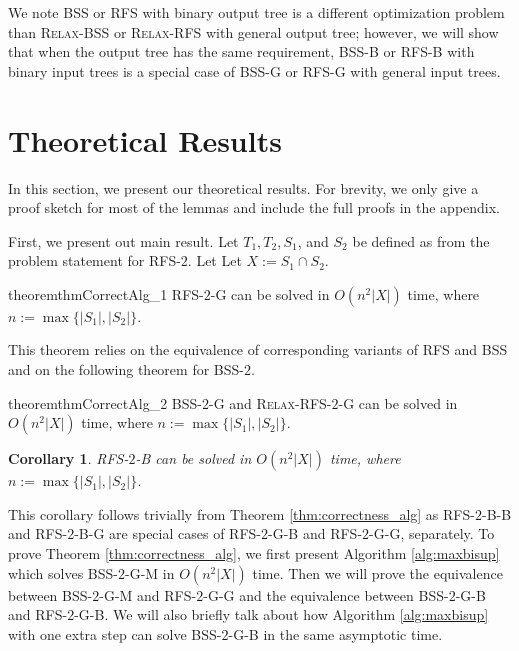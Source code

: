 \documentclass[twocolumn]{bmcart}%
\newcommand{\bss}{\textsc{BSS}\xspace}
\newcommand{\rfs}{\textsc{RFS}\xspace}
\newcommand{\relaxed}{\textsc{Relax}-}
\newcommand{\bsstwo}{\textsc{BSS-$2$}\xspace}
\newcommand{\rftwo}{\textsc{RFS-$2$}\xspace}
\newcommand{\B}{\textsc{B}\xspace}
\renewcommand{\G}{\textsc{G}\xspace}
\renewcommand{\M}{\textsc{M}\xspace}
\theoremstyle{mystyle}
\newtheorem{corollary}{Corollary}
\theoremstyle{proofstyle}
\begin{document}
We note \bss or \rfs with binary output tree is a different optimization problem than \relaxed\bss or \relaxed\rfs with general output tree; however, we will show that
when the output tree has the same requirement, 
\bss-\B or \rfs-\B with binary input trees is a special case of \bss-\G or \rfs-\G with general input trees. 


\section{Theoretical Results} \label{sec:theory}

In this section, we present our theoretical results. For brevity, we only give a proof sketch for most of the lemmas and include the full proofs in the appendix.  

First, we present out main result. Let $T_1,T_2,S_1$, and $S_2$ be defined as from the problem statement for \rftwo. Let Let $X:= S_1 \cap S_2$.
\begin{restatable}{theorem}{thmCorrectAlg_1} \label{thm:correctness_alg}
    \rftwo-\G can be solved in $O(n^2|X|)$ time, where $n :=\max\{|S_1|,|S_2|\}$.
\end{restatable}
This theorem relies on the equivalence of corresponding variants of \rfs and \bss and on the following theorem for \bsstwo.
    
\begin{restatable}{theorem}{thmCorrectAlg_2}
    \bsstwo-\G and \relaxed\rftwo-\G can be solved in $O(n^2|X|)$ time, where $n :=\max\{|S_1|,|S_2|\}$.
\end{restatable}    
  
\begin{corollary}\label{cor:correctness_alg}
    \rftwo-\B can be solved in $O(n^2|X|)$ time, where $n :=\max\{|S_1|,|S_2|\}$.
\end{corollary}
This corollary follows trivially from Theorem \ref{thm:correctness_alg} as \rftwo-\B-\B and \rftwo-\B-\G are special cases of \rftwo-\G-\B and \rftwo-\G-\G, separately. To prove Theorem \ref{thm:correctness_alg}, we first present Algorithm \ref{alg:maxbisup} which solves \bsstwo-\G-\M in $O(n^2|X|)$ time. Then we will prove the equivalence between \bsstwo-\G-\M and \rftwo-\G-\G and the equivalence between \bsstwo-\G-\B and \rftwo-\G-\B. We will also briefly talk about how Algorithm \ref{alg:maxbisup} with one extra step can solve \bsstwo-\G-\B in the same asymptotic time. 
\end{document}

